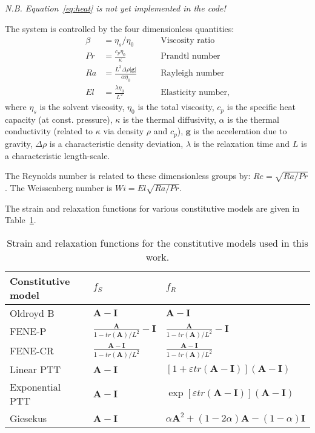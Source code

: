 \documentclass[notitlepage]{revtex4-2}
\begin{document}
\emph{N.B. Equation~\eqref{eq:heat} is not yet implemented in the code!}

The system is controlled by the four dimensionless quantities:
\begin{subequations}
\begin{align}\beta&=\eta_{s}/\eta_{0}\qquad&\text{Viscosity ratio}\\
Pr&=\frac{c_{p}\eta_{0}}{\kappa}\qquad&\text{Prandtl number}\\
Ra&=\frac{L^{3}\Delta\rho\left\lvert\bm{g}\right\rvert}{\alpha\eta_{0}}\qquad&\text{Rayleigh number}\\
El&=\frac{\lambda\eta_{0}}{L^{2}}\qquad&\text{Elasticity number},
\end{align}\end{subequations}
where $\eta_{s}$ is the solvent viscosity, $\eta_{0}$ is the total viscosity, $c_{p}$ is the specific heat capacity (at const. pressure), $\kappa$ is the thermal diffusivity, $\alpha$ is the thermal conductivity (related to $\kappa$ via density $\rho$ and $c_{p}$), $\bm{g}$ is the acceleration due to gravity, $\Delta\rho$ is a characteristic density deviation, $\lambda$ is the relaxation time and $L$ is a characteristic length-scale.

The Reynolds number is related to these dimensionless groups by: $Re=\sqrt{Ra/Pr}$. The Weissenberg number is $Wi=El\sqrt{Ra/Pr}$.

The strain and relaxation functions for various constitutive models are given in Table~\ref{tab:cm}.

\begin{table}
\begin{center}
\caption{Strain and relaxation functions for the constitutive models used in this work.\label{tab:cm}}
\begin{tabular}{|l|l|l|}
Constitutive model & $f_{S}$& $f_{R}$\\
\hline
Oldroyd B & $\bm{A}-\bm{I}$ & $\bm{A}-\bm{I}$ \\
FENE-P & $\frac{\bm{A}}{1-tr\left(\bm{A}\right)/L^{2}}-\bm{I}$ & $\frac{\bm{A}}{1-tr\left(\bm{A}\right)/L^{2}}-\bm{I}$ \\
FENE-CR & $\frac{\bm{A}-\bm{I}}{1-tr\left(\bm{A}\right)/L^{2}}$ & $\frac{\bm{A}-\bm{I}}{1-tr\left(\bm{A}\right)/L^{2}}$ \\
Linear PTT & $\bm{A}-\bm{I}$ & $\left[1+\varepsilon{tr}\left(\bm{A}-\bm{I}\right)\right]\left(\bm{A}-\bm{I}\right)$ \\
Exponential PTT & $\bm{A}-\bm{I}$ & $\exp\left[\varepsilon{tr}\left(\bm{A}-\bm{I}\right)\right]\left(\bm{A}-\bm{I}\right)$ \\
Giesekus & $\bm{A}-\bm{I}$ & $\alpha\bm{A}^{2}+\left(1-2\alpha\right)\bm{A}-\left(1-\alpha\right)\bm{I}$ \\
\end{tabular}
\end{center}
\end{table}
\end{document}
